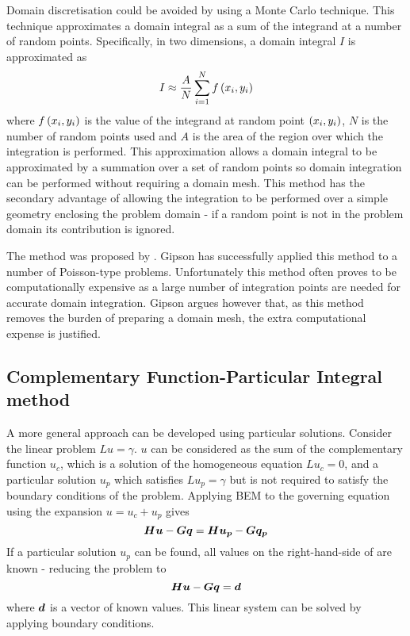 Domain discretisation could be avoided by using a Monte Carlo technique.
This technique approximates a domain integral as a sum of the integrand
at a number of random points. Specifically, in two dimensions, a domain
integral $I$ is approximated as 
\begin{equation}
  I \approx \dfrac{A}{N}  \displaystyle\sum_{i=1}^{N}   f\left( x_{i},y_{i} \right) 
\end{equation}
where $ f\left( x_{i},y_{i} \right) $ is the value of the integrand at random point
$\left( x_{i},y_{i} \right)$, $N$ is the number of random points used and $A$ is the
area of the region over which the integration is performed.  This
approximation allows a domain integral to be approximated by a summation
over a set of random points so domain integration can be performed without
requiring a domain mesh.  This method has the secondary advantage of
allowing the integration to be performed over a simple geometry enclosing
the problem domain - if a random point is not in the problem domain its
contribution is ignored.

The method was proposed by .  Gipson has
successfully applied this method to a number of Poisson-type problems.
Unfortunately this method often proves to be computationally expensive as a
large number of integration points are needed for accurate domain
integration.  Gipson argues however that, as this method removes the burden
of preparing a domain mesh, the extra computational expense is justified.

\subsection{Complementary Function-Particular Integral method}
\label{sec:anapim}

A more general approach can be developed using particular solutions.  Consider
the linear problem $Lu = \gamma$. $u$ can be considered as the sum of the
complementary function $u_{c}$, which is a solution of the homogeneous
equation $Lu_{c} = 0$, and a particular solution $u_{p}$ which satisfies
$Lu_{p} = \gamma$ but is not required to satisfy the boundary conditions of
the problem.  Applying BEM to the governing equation using the expansion 
 $u =u_{c} + u_{p}$ gives
\begin{equation}
  \matr{H} \vect{u} - \matr{G} \vect{q} = \matr{H} \vect{u_{p}} - \matr{G}
  \vect{q_{p}}
\label{eq:partic}
\end{equation}
If a particular solution $u_{p}$ can be found, all values on the
right-hand-side of  are known - reducing the problem to
\begin{equation}
  \matr{H} \vect{u} - \matr{G} \vect{q} = \vect{d}
\end{equation}
where $\vect{d}$ is a vector of known values.  This linear system can be
solved by applying boundary conditions.  

